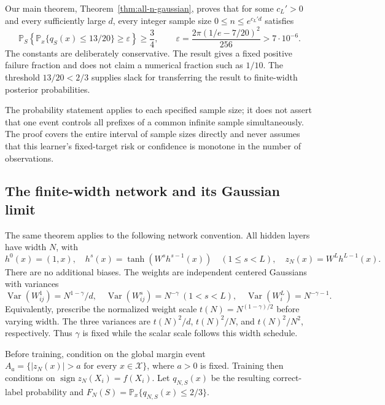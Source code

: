 \documentclass[11pt]{article}
\theoremstyle{remark}\newtheorem{remark}[theorem]{Remark}
\DeclareMathOperator{\Var}{Var}
\DeclareMathOperator{\sign}{sign}
\begin{document}
Our main theorem, Theorem~\ref{thm:all-n-gaussian}, proves that for
some $c_L'>0$ and every sufficiently large $d$, every integer sample size
$0\le n\le e^{c_L'd}$ satisfies
\[
 \mathbb P_S\!\left\{\mathbb P_x\{q_S(x)\le13/20\}
                                      \ge\varepsilon\right\}\ge\frac34,
 \qquad \varepsilon=\frac{2\pi(1/e-7/20)^2}{256}>7\cdot10^{-6}.
\]
The constants are deliberately conservative. The result gives a fixed
positive failure fraction and does not claim a numerical fraction such
as $1/10$. The threshold $13/20<2/3$ supplies slack for transferring
the result to finite-width posterior probabilities.

The probability statement applies to each specified sample size; it does
not assert that one event controls all prefixes of a common infinite
sample simultaneously. The proof covers the entire interval of sample
sizes directly and never assumes that this learner's fixed-target risk
or confidence is monotone in the number of observations.

\subsection{The finite-width network and its Gaussian limit}
The same theorem applies to the following network convention. All
hidden layers have width $N$, with
\[
 h^0(x)=(1,x),\quad
 h^s(x)=\tanh(W^s h^{s-1}(x))\quad(1\le s<L),\quad
 z_N(x)=W^L h^{L-1}(x).
\]
There are no additional biases. The weights are independent centered
Gaussians with variances
\begin{equation}\label{eq:paper-weights}
 \Var(W^1_{ij})=N^{1-\gamma}/d,\quad
 \Var(W^s_{ij})=N^{-\gamma}\ (1<s<L),\quad
 \Var(W^L_i)=N^{-\gamma-1}.
\end{equation}
Equivalently, prescribe the normalized weight scale
$t(N)=N^{(1-\gamma)/2}$ before varying width. The three variances are
$t(N)^2/d$, $t(N)^2/N$, and $t(N)^2/N^2$, respectively.
Thus $\gamma$ is fixed while the scalar scale follows this width schedule.

Before training, condition on the global margin event
$A_a=\{|z_N(x)|>a\text{ for every }x\in\mathcal X\}$, where $a>0$
is fixed. Training then conditions on $\sign z_N(X_i)=f(X_i)$.
Let $q_{N,S}(x)$ be the resulting correct-label probability and
$F_N(S)=\mathbb P_x\{q_{N,S}(x)\le2/3\}$.
\end{document}
